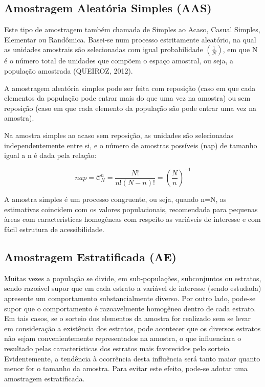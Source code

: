 \subsection{Amostragem Aleatória Simples (AAS)}

\inic Este tipo de amostragem também chamada de Simples ao Acaso,
Casual Simples, Elementar ou Randômica. Basei-se num processo
estritamente aleatório, na qual as unidades amostrais são
selecionadas com igual probabilidade $(\frac{1}{N})$, em que N é o
número total de unidades que compõem o espaço amostral, ou seja, a
população amostrada (QUEIROZ, 2012).\vskip0.3cm


A amostragem aleatória simples pode ser feita com reposição (caso em
que cada elementos da população pode entrar mais do que uma vez na
amostra) ou sem reposição (caso em que cada elemento da população
são pode entrar uma vez na amostra).\vskip0.3cm



Na amostra simples ao acaso sem reposição, as unidades são selecionadas independentemente entre si, e o número de amostras possíveis (nap) de tamanho igual a n é dada pela relação:


\begin{equation}\label{nap}
    nap=\mathcal{C}_{N}^{n}=\frac{N!}{n!(N-n)!}=\left(\frac{N}{n}\right)^{-1}
\end{equation}

A amostra simples é um processo congruente, ou seja, quando n=N, as estimativas coincidem com os valores populacionais, recomendada para pequenas àreas com caracteristicas homogêneas com respeito as variáveis de interesse e com fácil estrutura de acessibilidade.

\subsection{Amostragem Estratificada (AE)}

\inic Muitas vezes a população se divide, em sub-populações,
subconjuntos ou estratos, sendo razoável supor que em cada estrato
a variável de interesse (sendo estudada) apresente um
comportamento substancialmente diverso. Por outro lado, pode-se
supor que o comportamento é razoavelmente homogêneo dentro de cada
estrato. Em tais casos, se o sorteio dos elementos da amostra for
realizado sem se levar em consideração a existência dos estratos,
pode acontecer que os diversos estratos não sejam convenientemente
representados na amostra, o que influenciara o resultado pelas
características dos estratos mais favorecidos pelo sorteio.
Evidentemente, a tendência à ocorrência desta influência será
tanto maior quanto menor for o tamanho da amostra. Para evitar
este efeito, pode-se adotar uma amostragem estratificada.\vskip0.3cm

